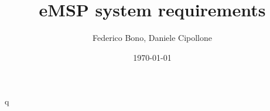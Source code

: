 q\documentclass[a4paper]{report}
\begin{document}
\titleformat{\chapter}[hang] 
{\normalfont\huge\bfseries}{\thechapter}{1em}{} 

\title{eMSP system requirements}
\author{Federico Bono, Daniele Cipollone}
\date{\today}

\newcommand\descitem[1]{\item{\bfseries #1}\\}




\tableofcontents
\listoffigures
\restoregeometry






\end{document}
